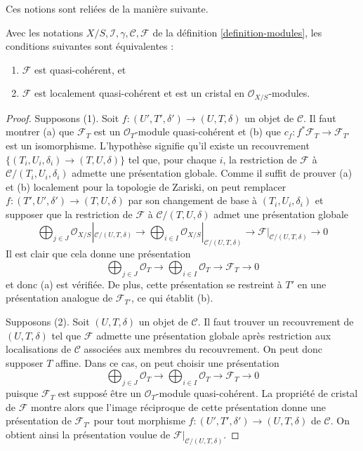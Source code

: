 \noindent
Ces notions sont reliées de la manière suivante.

\begin{lemma}
\label{lemma-crystal-quasi-coherent-modules}
Avec les notations $X/S, \mathcal{I}, \gamma, \mathcal{C}, \mathcal{F}$
de la définition \ref{definition-modules}, les conditions suivantes sont équivalentes :
\begin{enumerate}
\item $\mathcal{F}$ est quasi-cohérent, et
\item $\mathcal{F}$ est localement quasi-cohérent et est un cristal en
$\mathcal{O}_{X/S}$-modules.
\end{enumerate}
\end{lemma}

\begin{proof}
Supposons (1). Soit $f : (U', T', \delta') \to (U, T, \delta)$ un objet de
$\mathcal{C}$. Il faut montrer (a) que $\mathcal{F}_T$ est un
$\mathcal{O}_T$-module quasi-cohérent et (b) que $c_f : f^*\mathcal{F}_T \to \mathcal{F}_{T'}$
est un isomorphisme. L'hypothèse signifie qu'il existe un recouvrement
$\{(T_i, U_i, \delta_i) \to (T, U, \delta)\}$ tel que, pour chaque $i$,
la restriction de $\mathcal{F}$ à $\mathcal{C}/(T_i, U_i, \delta_i)$
admette une présentation globale. Comme il suffit de prouver (a) et (b)
localement pour la topologie de Zariski, on peut remplacer $f : (T', U', \delta') \to (T, U, \delta)$
par son changement de base à $(T_i, U_i, \delta_i)$ et supposer que la restriction de $\mathcal{F}$
à $\mathcal{C}/(T, U, \delta)$ admet une
présentation globale
$$
\bigoplus\nolimits_{j \in J}
\mathcal{O}_{X/S}|_{\mathcal{C}/(U, T, \delta)} \longrightarrow
\bigoplus\nolimits_{i \in I}
\mathcal{O}_{X/S}|_{\mathcal{C}/(U, T, \delta)} \longrightarrow
\mathcal{F}|_{\mathcal{C}/(U, T, \delta)}
\longrightarrow 0
$$
Il est clair que cela donne une présentation
$$
\bigoplus\nolimits_{j \in J} \mathcal{O}_T \longrightarrow
\bigoplus\nolimits_{i \in I} \mathcal{O}_T \longrightarrow
\mathcal{F}_T
\longrightarrow 0
$$
et donc (a) est vérifiée. De plus, cette présentation se restreint à $T'$
en une présentation analogue de $\mathcal{F}_{T'}$, ce qui établit (b).

\medskip\noindent
Supposons (2). Soit $(U, T, \delta)$ un objet de $\mathcal{C}$.
Il faut trouver un recouvrement de $(U, T, \delta)$ tel que $\mathcal{F}$ admette une
présentation globale après restriction aux localisations de $\mathcal{C}$
associées aux membres du recouvrement. On peut donc supposer $T$ affine.
Dans ce cas, on peut choisir une présentation
$$
\bigoplus\nolimits_{j \in J} \mathcal{O}_T \longrightarrow
\bigoplus\nolimits_{i \in I} \mathcal{O}_T \longrightarrow
\mathcal{F}_T
\longrightarrow 0
$$
puisque $\mathcal{F}_T$ est supposé être un $\mathcal{O}_T$-module quasi-cohérent.
La propriété de cristal de $\mathcal{F}$ montre alors que l'image réciproque de cette présentation donne
une présentation de $\mathcal{F}_{T'}$ pour tout morphisme
$f : (U', T', \delta') \to (U, T, \delta)$ de $\mathcal{C}$.
On obtient ainsi la présentation voulue de $\mathcal{F}|_{\mathcal{C}/(U, T, \delta)}$.
\end{proof}

